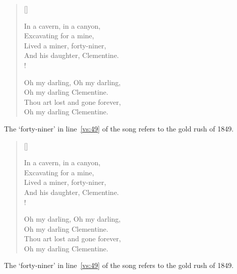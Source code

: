\begin{lcode}
\settowidth{\versewidth}{In a cavern, in a canyon,}
\begin{verse}[\versewidth]
\begin{altverse}
 In a cavern, in a canyon, \\
Excavating for a mine, \\
Lived a miner, forty-niner, \label{vs:49} \\
And his daughter, Clementine. \\!
\end{altverse}

\begin{altverse}
 Oh my darling, Oh my darling, \\
Oh my darling Clementine. \\
Thou art lost and gone forever, \\
Oh my darling Clementine.
\end{altverse}
\end{verse}
The `forty-niner' in line~\ref{vs:49} of the song
refers to the gold rush of 1849.
\end{lcode}

\settowidth{\versewidth}{In a cavern, in a canyon,}
\begin{verse}[\versewidth]
\begin{altverse}
 In a cavern, in a canyon, \\
Excavating for a mine, \\
Lived a miner, forty-niner, \label{vs:49} \\
And his daughter, Clementine. \\!
\end{altverse}

\begin{altverse}
 Oh my darling, Oh my darling, \\
Oh my darling Clementine. \\
Thou art lost and gone forever, \\
Oh my darling Clementine.
\end{altverse}
\end{verse}

\vspace{\onelineskip}

The `forty-niner' in line~\ref{vs:49} of the song
refers to the gold rush of 1849.


